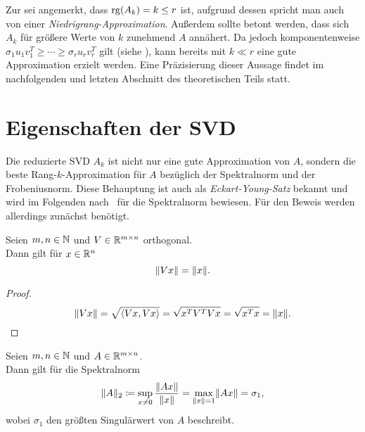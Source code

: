 Zur  sei angemerkt, dass \(\operatorname{rg}(A_k)=k \leq r\) ist, aufgrund dessen spricht man auch von einer \emph{Niedrigrang-Approximation}.
Außerdem sollte betont werden, dass sich \(A_k\) für größere Werte von \(k\) zunehmend \(A\) annähert.
Da jedoch komponentenweise \(\sigma_1 u_1 v^{T}_1 \geq \cdots \geq \sigma_r u_r v^{T}_r\) gilt (siehe ), kann bereits mit \(k \ll r\) eine gute Approximation erzielt werden.
Eine Präzisierung dieser Aussage findet im nachfolgenden und letzten Abschnitt des theoretischen Teils statt.

\section{Eigenschaften der SVD}

Die reduzierte SVD \(A_{k}\) ist nicht nur eine gute Approximation von \(A\), sondern die beste Rang-\(k\)-Approximation für \(A\) bezüglich der Spektralnorm und der Frobeniusnorm.
Diese Behauptung ist auch als \emph{Eckart-Young-Satz} bekannt und wird im Folgenden nach~\cite[7]{zhangLinearAlgebraData2022} für die Spektralnorm bewiesen.
Für den Beweis werden allerdings zunächst  benötigt.
\begin{lemma}\label{lem:normorth}
    Seien \(m,n \in \mathbb{N}\) und \(V \in \mathbb{R}^{m \times n}\) orthogonal. \\
    Dann gilt für \(x \in \mathbb{R}^{n}\)
    \begin{equation*}
        \lVert Vx\rVert = \lVert x\rVert.
    \end{equation*} 
\end{lemma}
\begin{proof}
    \begin{equation*}
    \lVert Vx\rVert = \sqrt{\langle Vx,Vx \rangle} = \sqrt{x^{T}V^{T}Vx} = \sqrt{x^{T}x} = \lVert x\rVert.
    \end{equation*}
\end{proof}
\begin{lemma}\label{lem:eck}
    Seien \(m,n \in \mathbb{N}\) und \(A \in \mathbb{R}^{m \times n}\). \\
    Dann gilt für die Spektralnorm
    \begin{equation*}
        \lVert A\rVert_{2} \coloneqq\sup\limits_{x \neq 0} \frac{\lVert Ax\rVert}{\lVert x\rVert} = \max\limits_{\lVert x\rVert=1} \lVert Ax\rVert = \sigma_{1},
    \end{equation*}
    wobei \(\sigma_{1}\) den größten Singulärwert von \(A\) beschreibt. 
\end{lemma}
